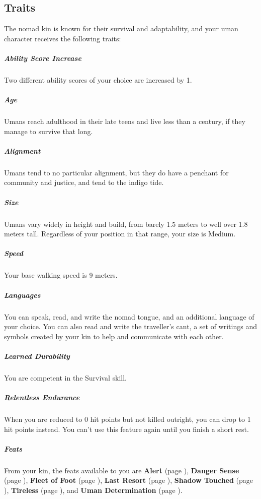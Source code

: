 \subsection*{Traits}
    The nomad kin is known for their survival and adaptability, and your uman character receives the following traits:

    \subparagraph{Ability Score Increase} Two different ability scores of your choice are increased by 1.

    \subparagraph{Age} Umans reach adulthood in their late teens and live less than a century, if they manage to survive that long.

    \subparagraph{Alignment} Umans tend to no particular alignment, but they do have a penchant for community and justice, and tend to the indigo tide.

    \subparagraph{Size} Umans vary widely in height and build, from barely 1.5 meters to well over 1.8 meters tall.
    Regardless of your position in that range, your size is Medium.

    \subparagraph{Speed} Your base walking speed is 9 meters.

    \subparagraph{Languages} You can speak, read, and write the nomad tongue, and an additional language of your choice.
    You can also read and write the traveller's cant, a set of writings and symbols created by your kin to help and communicate with each other.

    \subparagraph{Learned Durability} You are competent in the Survival skill.

    \subparagraph{Relentless Endurance} When you are reduced to 0 hit points but not killed outright, you can drop to 1 hit points instead.
    You can't use this feature again until you finish a short rest.

    \subparagraph{Feats} From your kin, the feats available to you are
    \textbf{Alert} (page \pageref{feat::alert}),
    \textbf{Danger Sense} (page \pageref{feat::dangersense}),
    \textbf{Fleet of Foot} (page \pageref{feat::fleetoffoot}),
    \textbf{Last Resort} (page \pageref{feat::lastresort}),
    \textbf{Shadow Touched} (page \pageref{feat::shadowtouched}),
    \textbf{Tireless} (page \pageref{feat::tireless}), and
    \textbf{Uman Determination} (page \pageref{feat::umandetermination}).

